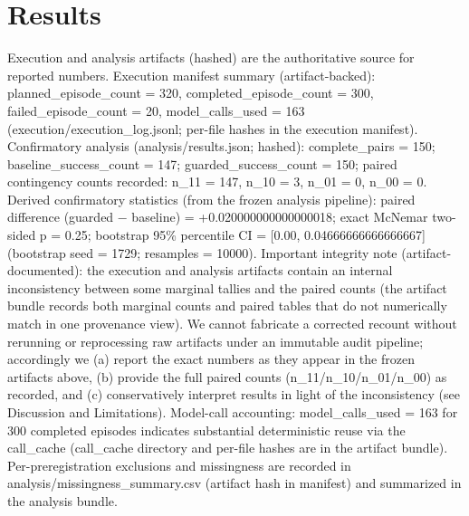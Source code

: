 \documentclass[conference]{IEEEtran}
\begin{document}
\section{Results}
Execution and analysis artifacts (hashed) are the authoritative source for reported numbers. Execution manifest summary (artifact-backed): planned\_episode\_count = 320, completed\_episode\_count = 300, failed\_episode\_count = 20, model\_calls\_used = 163 (execution/execution\_log.jsonl; per-file hashes in the execution manifest). Confirmatory analysis (analysis/results.json; hashed): complete\_pairs = 150; baseline\_success\_count = 147; guarded\_success\_count = 150; paired contingency counts recorded: n\_11 = 147, n\_10 = 3, n\_01 = 0, n\_00 = 0. Derived confirmatory statistics (from the frozen analysis pipeline): paired difference (guarded − baseline) = +0.020000000000000018; exact McNemar two-sided p = 0.25; bootstrap 95\% percentile CI = [0.00, 0.04666666666666667] (bootstrap seed = 1729; resamples = 10000). Important integrity note (artifact-documented): the execution and analysis artifacts contain an internal inconsistency between some marginal tallies and the paired counts (the artifact bundle records both marginal counts and paired tables that do not numerically match in one provenance view). We cannot fabricate a corrected recount without rerunning or reprocessing raw artifacts under an immutable audit pipeline; accordingly we (a) report the exact numbers as they appear in the frozen artifacts above, (b) provide the full paired counts (n\_11/n\_10/n\_01/n\_00) as recorded, and (c) conservatively interpret results in light of the inconsistency (see Discussion and Limitations). Model-call accounting: model\_calls\_used = 163 for 300 completed episodes indicates substantial deterministic reuse via the call\_cache (call\_cache directory and per-file hashes are in the artifact bundle). Per-preregistration exclusions and missingness are recorded in analysis/missingness\_summary.csv (artifact hash in manifest) and summarized in the analysis bundle.
\end{document}
